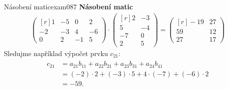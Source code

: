 \begin{mathexam}{Násobení matic}{exam087}
  \textbf{Násobení matic}
  \begingroup
  \renewcommand\arraystretch{1.0}
  \renewcommand\arraycolsep{3pt}
    \begin{gather*}
      \begin{pmatrix*}[r]
          1 & -5 &  0 &  2 \\
        -2 & -3 &  4 & -6 \\
          0 &  2 & -1 &  5
      \end{pmatrix*} \cdot
      \begin{pmatrix*}[r]
          2 & -3 \\
          5 & -4 \\
          -7 &  0 \\
          2 &  5
      \end{pmatrix*} = 
      \begin{pmatrix*}[r]
        -19 & 27 \\
          59 & 12 \\
          27 & 17
      \end{pmatrix*} 
    \end{gather*} 
  \endgroup
  Sledujme například výpočet prvku \(c_{21}\):
  \begin{gather*}
    \begin{align*}
      c_{21} &= a_{21}b_{11} + a_{22}b_{21} + a_{23}b_{31} + a_{24}b_{41}  \\
             &= (-2)\cdot2 + (-3)\cdot5 + 4\cdot(-7) + (-6)\cdot2 \\
             &= -59.
    \end{align*} 
  \end{gather*}
\end{mathexam}